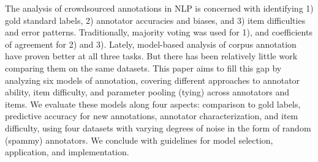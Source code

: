 The analysis of crowdsourced annotations in NLP is concerned with identifying 1) gold standard labels, 2) annotator accuracies and biases, and 3) item difficulties and error patterns. Traditionally, majority voting was used for 1), and coefficients of agreement for 2) and 3). Lately, model-based analysis of corpus annotation have proven better at all three tasks. But there has been relatively little work comparing them on the same datasets. This paper aims to fill this gap by analyzing six models of annotation, covering different approaches to annotator ability, item difficulty, and parameter pooling (tying) across annotators and items. We evaluate these models along four aspects: comparison to gold labels, predictive accuracy for new annotations, annotator characterization, and item difficulty, using four datasets with varying degrees of noise in the form of random (spammy) annotators. We conclude with guidelines for model selection, application, and implementation.
